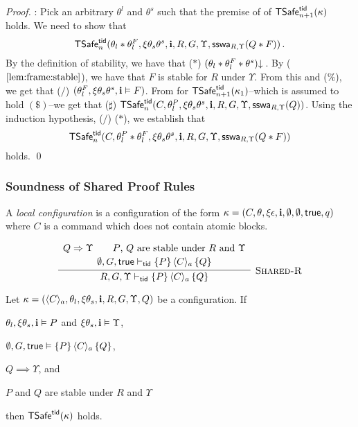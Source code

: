 \begin{proof}
: 
Pick an arbitrary $\theta^l$ and $\theta^{s}$ such that the 
premise of  of $\safe_{n+1}(\kappa)$ holds. 
We need to show that 
$$
\safe_n(\theta_l*\theta_l^F,\xi\theta_s\theta^s,\intp,R,G,\Upsilon,\sswa{Q * F}{R}{\Upsilon})\,.
$$
By the definition of stability, we have that ($*$)  $\consistent{\theta_l*\theta_l^F*\theta^s}$\,.
By ($\ref{lem:frame:stable}$), we have that $F$ is stable for $R$ under $\Upsilon$. 
From this and ($\%$), we get that ($/$)
$(\theta^F_l,\xi\theta_s\theta^s,\intp \vDash F)$.
From  for $\safe_{n+1}(\kappa_1)$--which is assumed to 
hold $(\$)$--we get that ($\sharp$)
$\safe_n(C,\theta^P_l,\xi\theta_s\theta^{s},\intp,R,G,\Upsilon, \sswa{Q}{R}{\Upsilon})$.
Using the induction hypothesis, ($/$) ($*$), 
we establish that 
$$
\safe_n(C,\theta^P_l * \theta^F_l,\xi\theta_s\theta^{s},\intp,R,G,\Upsilon,  \sswa{Q*F}{R}{\Upsilon})
$$
holds. %
\qed
\end{proof}


\subsubsection{Soundness of Shared Proof Rules} %
\label{sec:sound:shared}

\begin{defin}\label{def:localconfig}
  A \emph{local configuration}  is a configuration of the form
  $\kappa=(C,\theta,\xi\unit,\intp,\emptyset,\emptyset, \true, q)$  
  where $C$ is a command which does not contain atomic blocks.
\end{defin} 


\[
\infer[\textsc{Shared-R}]{
R, G, \Upsilon \tvdash  \{P\}\, 
\langle C\rangle_a \, 
\{ Q \} %
}{
\begin{array}{c}
Q \Rightarrow \Upsilon \qquad
\text{$P$, $Q$ are stable under $R$ and $\Upsilon$}
\\[2pt]
\emptyset,G,\true \tvdash \{ P \} \,\langle C\rangle_a\, \{ Q \}
\end{array}
}
\]

\begin{lemma}[Shared-R]\label{lem:SharedR}
Let $\kappa=(\langle C \rangle_a,\theta_l,\xi\theta_s,\intp,R,G,\Upsilon, Q)$
be a configuration.
If 
\begin{compactenum}		
\item \label{sharedr:pre}
$\theta_l,\xi\theta_s,\intp \vDash P$ and 
$\xi\theta_s,\intp \vDash \Upsilon$, 
\item \label{sharedr:safe}
$\emptyset,G,\true \vDash \{ P \} \,\langle C\rangle_a\, \{ Q \}$,
\item  \label{sharedr:inv}
$Q \implies \Upsilon$, and 
\item \label{sharedr:stable}
$P$ and $Q$ are stable under $R$ and $\Upsilon$
\end{compactenum}
then  
$\safe(\kappa)$ holds.
\end{lemma}

